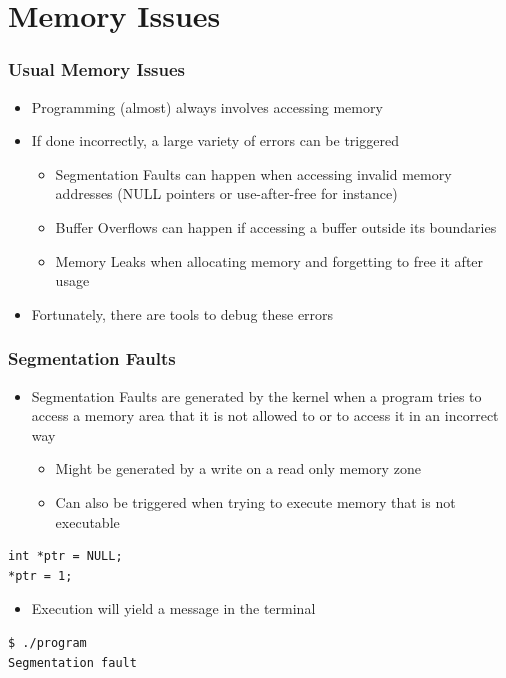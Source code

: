 \section{Memory Issues}

\begin{frame}
  \frametitle{Usual Memory Issues}
  \begin{itemize}
    \item Programming (almost) always involves accessing memory
    \item If done incorrectly, a large variety of errors can be triggered
    \begin{itemize}
      \item Segmentation Faults can happen when accessing invalid memory
            addresses (NULL pointers or use-after-free for instance)
      \item Buffer Overflows can happen if accessing a buffer outside its
            boundaries
      \item Memory Leaks when allocating memory and forgetting to free it after
            usage
    \end{itemize}
    \item Fortunately, there are tools to debug these errors
  \end{itemize}
\end{frame}

\begin{frame}[fragile]
  \frametitle{Segmentation Faults}
  \begin{itemize}
    \item Segmentation Faults are generated by the kernel when a program tries to
          access a memory area that it is not allowed to or to access it in an
          incorrect way
    \begin{itemize}
      \item Might be generated by a write on a read only memory zone
      \item Can also be triggered when trying to execute memory that is not
            executable
    \end{itemize}
  \end{itemize}

  \begin{block}{}
    \begin{verbatim}
int *ptr = NULL;
*ptr = 1;
    \end{verbatim}
  \end{block}

  \begin{itemize}
    \item Execution will yield a  message in the
          terminal
  \end{itemize}
  \vspace{0.2cm}

  \begin{block}{}
    \begin{verbatim}
$ ./program
Segmentation fault
    \end{verbatim}
  \end{block}
\end{frame}


